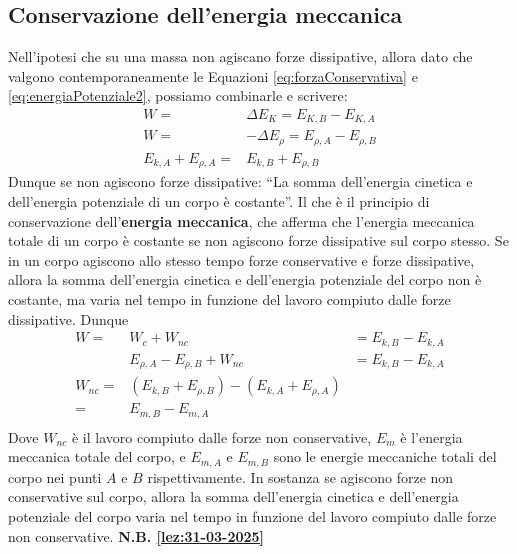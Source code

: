         \subsection{Conservazione dell'energia meccanica}
            \label{subsec:conservazioneEnergiaMeccanica}
            Nell'ipotesi che su una massa non agiscano forze dissipative, allora dato che valgono contemporaneamente le Equazioni \ref{eq:forzaConservativa} e \ref{eq:energiaPotenziale2}, possiamo combinarle e scrivere:
            \begin{align}
                W =& \Delta E_K = E_{K,B} - E_{K,A} \nonumber\\
                W =& -\Delta E_{\rho} = E_{\rho,A} - E_{\rho,B} \nonumber\\
                E_{k,A} + E_{\rho,A} =& E_{k,B} + E_{\rho,B} 
            \end{align}
            Dunque se non agiscono forze dissipative: ``La somma dell'energia cinetica e dell'energia potenziale di un corpo è costante''. Il che è il principio di conservazione dell'\textbf{energia meccanica}, che afferma che l'energia meccanica totale di un corpo è costante se non agiscono forze dissipative sul corpo stesso. \newline
            Se in un corpo agiscono allo stesso tempo forze conservative e forze dissipative, allora la somma dell'energia cinetica e dell'energia potenziale del corpo non è costante, ma varia nel tempo in funzione del lavoro compiuto dalle forze dissipative. Dunque
            \begin{align*}
                W =& W_{c} + W_{nc} &= E_{k,B} - E_{k,A}\\
                & E_{\rho,A} - E_{\rho,B} + W_{nc} &= E_{k,B} - E_{k,A}\\
                W_{nc} =& (E_{k,B} + E_{\rho,B}) - (E_{k,A} + E_{\rho,A})&\\
                =& E_{m,B} - E_{m,A}\\
            \end{align*}
            Dove $W_{nc}$ è il lavoro compiuto dalle forze non conservative, $E_{m}$ è l'energia meccanica totale del corpo, e $E_{m,A}$ e $E_{m,B}$ sono le energie meccaniche totali del corpo nei punti $A$ e $B$ rispettivamente. In sostanza se agiscono forze non conservative sul corpo, allora la somma dell'energia cinetica e dell'energia potenziale del corpo varia nel tempo in funzione del lavoro compiuto dalle forze non conservative.\newline
            \textbf{N.B. \ref{lez:31-03-2025}}
